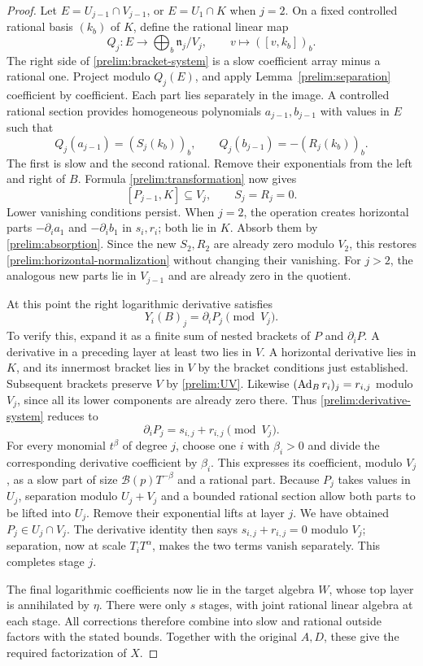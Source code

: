 \begin{proof}
Let $E=U_{j-1}\cap V_{j-1}$, or $E=U_1\cap K$ when $j=2$.
On a fixed controlled rational basis $(k_b)$ of $K$, define the
rational linear map
\[
 Q_j:E\longrightarrow\bigoplus_b\mathfrak n_j/V_j,
 \qquad v\longmapsto([v,k_b])_b.
\]
The right side of \eqref{prelim:bracket-system} is a slow
coefficient array minus a rational one.  Project modulo
$Q_j(E)$, and apply Lemma~\ref{prelim:separation} coefficient
by coefficient.  Each part lies separately in the image.
A controlled rational section provides homogeneous polynomials
$a_{j-1},b_{j-1}$ with values in $E$ such that
\[
 Q_j(a_{j-1})=(S_j(k_b))_b,\qquad
 Q_j(b_{j-1})=-(R_j(k_b))_b.
\]
The first is slow and the second rational.  Remove their
exponentials from the left and right of $B$.  Formula
\eqref{prelim:transformation} now gives
\[
 [P_{j-1},K]\subseteq V_j,\qquad S_j=R_j=0.
\]
Lower vanishing conditions persist.  When $j=2$, the operation
creates horizontal parts $-\partial_i a_1$ and
$-\partial_i b_1$ in $s_i,r_i$; both lie in $K$.
Absorb them by \eqref{prelim:absorption}.  Since the new
$S_2,R_2$ are already zero modulo $V_2$, this restores
\eqref{prelim:horizontal-normalization} without changing their
vanishing.  For $j>2$, the analogous new parts lie in $V_{j-1}$
and are already zero in the quotient.

At this point the right logarithmic derivative satisfies
\[
 Y_i(B)_j=\partial_iP_j\pmod {V_j}.
\]
To verify this, expand it as a finite sum of nested brackets of
$P$ and $\partial_iP$.  A derivative in a preceding layer at
least two lies in $V$.  A horizontal derivative lies in $K$,
and its innermost bracket lies in $V$ by the bracket conditions
just established.  Subsequent brackets preserve $V$ by
\eqref{prelim:UV}.  Likewise $(\operatorname{Ad}_Br_i)_j=r_{i,j}$ modulo
$V_j$, since all its lower components are already zero there.
Thus \eqref{prelim:derivative-system} reduces to
\[
 \partial_iP_j=s_{i,j}+r_{i,j}\pmod {V_j}.
\]
For every monomial $t^\beta$ of degree $j$, choose one $i$ with
$\beta_i>0$ and divide the corresponding derivative coefficient
by $\beta_i$.  This expresses its coefficient, modulo $V_j$,
as a slow part of size $\mathcal B(p)T^{-\beta}$ and a
rational part.  Because $P_j$ takes values in $U_j$, separation
modulo $U_j+V_j$ and a bounded rational section allow both parts
to be lifted into $U_j$.  Remove their exponential lifts at
layer $j$.  We have obtained $P_j\in U_j\cap V_j$.
The derivative identity then says $s_{i,j}+r_{i,j}=0$ modulo
$V_j$; separation, now at scale $T_iT^\alpha$, makes the two
terms vanish separately.  This completes stage $j$.

The final logarithmic coefficients now lie in the target algebra
$W$, whose top layer is annihilated by $\eta$. There were only
$s$ stages, with
joint rational linear algebra at each stage.  All corrections
therefore combine into slow and rational outside factors with
the stated bounds.  Together with the original $A,D$, these
give the required factorization of $X$.
\end{proof}
